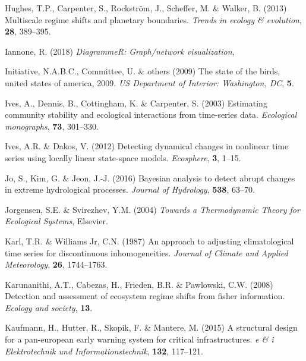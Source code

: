 \documentclass[print]{nuthesis}
\begin{document}
\leavevmode\hypertarget{ref-hughes2013multiscale}{}%
Hughes, T.P., Carpenter, S., Rockström, J., Scheffer, M. \& Walker, B. (2013) Multiscale regime shifts and planetary boundaries. \emph{Trends in ecology \& evolution}, \textbf{28}, 389--395.

\leavevmode\hypertarget{ref-DiagrammeR}{}%
Iannone, R. (2018) \emph{DiagrammeR: Graph/network visualization},

\leavevmode\hypertarget{ref-north2009state}{}%
Initiative, N.A.B.C., Committee, U. \& others (2009) The state of the birds, united states of america, 2009. \emph{US Department of Interior: Washington, DC}, \textbf{5}.

\leavevmode\hypertarget{ref-ives2003estimating}{}%
Ives, A., Dennis, B., Cottingham, K. \& Carpenter, S. (2003) Estimating community stability and ecological interactions from time-series data. \emph{Ecological monographs}, \textbf{73}, 301--330.

\leavevmode\hypertarget{ref-ives2012detecting}{}%
Ives, A.R. \& Dakos, V. (2012) Detecting dynamical changes in nonlinear time series using locally linear state-space models. \emph{Ecosphere}, \textbf{3}, 1--15.

\leavevmode\hypertarget{ref-jo2016bayesian}{}%
Jo, S., Kim, G. \& Jeon, J.-J. (2016) Bayesian analysis to detect abrupt changes in extreme hydrological processes. \emph{Journal of Hydrology}, \textbf{538}, 63--70.

\leavevmode\hypertarget{ref-jorgensen_towards_2004}{}%
Jorgensen, S.E. \& Svirezhev, Y.M. (2004) \emph{Towards a Thermodynamic Theory for Ecological Systems}, Elsevier.

\leavevmode\hypertarget{ref-karl1987approach}{}%
Karl, T.R. \& Williams Jr, C.N. (1987) An approach to adjusting climatological time series for discontinuous inhomogeneities. \emph{Journal of Climate and Applied Meteorology}, \textbf{26}, 1744--1763.

\leavevmode\hypertarget{ref-karunanithi_detection_2008}{}%
Karunanithi, A.T., Cabezas, H., Frieden, B.R. \& Pawlowski, C.W. (2008) Detection and assessment of ecosystem regime shifts from fisher information. \emph{Ecology and society}, \textbf{13}.

\leavevmode\hypertarget{ref-kaufmann2015structural}{}%
Kaufmann, H., Hutter, R., Skopik, F. \& Mantere, M. (2015) A structural design for a pan-european early warning system for critical infrastructures. \emph{e \& i Elektrotechnik und Informationstechnik}, \textbf{132}, 117--121.
\end{document}
